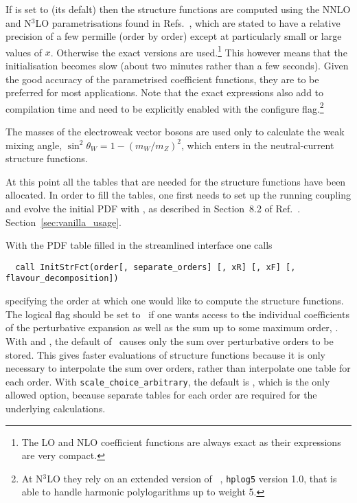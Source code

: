 If  is set to  (its defalt) then the
structure functions are computed using the NNLO and N$^3$LO
parametrisations found in
Refs.~\cite{vanNeerven:1999ca,vanNeerven:2000uj,Moch:2004xu,Vermaseren:2005qc,Moch:2008fj,Davies:2016ruz},
which are stated to have a relative precision of a few permille (order
by order) except at particularly small or large values of $x$.
%
Otherwise
the exact versions are used.\footnote{The LO and NLO coefficient
functions are always exact as their expressions are very
compact.}
%
This however means that the initialisation becomes slow (about two
minutes rather than a few seconds).
%
Given the good accuracy of the parametrised coefficient functions,
they are to be preferred for most applications.
% 
% 
Note that the exact expressions also add to compilation time and need
to be explicitly enabled with the  configure
flag.\footnote{At N$^3$LO they rely on an extended version of
  ~\cite{FortranPolyLog}, \texttt{hplog5} version 1.0, that
  is able to handle harmonic polylogarithms up to weight 5.}

The masses of the electroweak vector bosons are used only to calculate
the weak mixing angle, $\sin^2 \theta_W = 1 - (m_W/m_Z)^2$, which
enters in the neutral-current structure functions.

At this point all the tables that are needed for the structure
functions have been allocated.
%
In order to fill the tables, one first needs to set up the running
coupling and evolve the initial PDF with , as
described in
\ifreleasenote
Section~8.2 of Ref.~\cite{Salam:2008qg}.
\else
Section~\ref{sec:vanilla_usage}.
\fi

%
%
With the PDF table filled in the streamlined interface one calls
\begin{lstlisting}
  call InitStrFct(order[, separate_orders] [, xR] [, xF] [, flavour_decomposition])
\end{lstlisting}
specifying the order at which one would like to compute the structure
functions.
%
The logical flag  should be set to \ if one
wants access to the individual coefficients of the perturbative
expansion as well as the sum up to some maximum order, .
%
With  and , the
default of \ causes only the sum over perturbative orders
to be stored.
%
This gives faster evaluations of structure functions because it is
only necessary to interpolate the sum over orders, rather than
interpolate one table for each order.
%
With \texttt{scale\_choice\_arbitrary}, the default is ,
which is the only allowed option, because separate tables for each
order are required for the underlying calculations.

